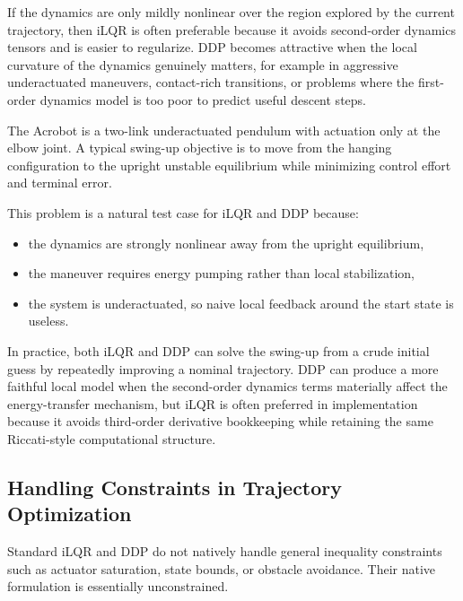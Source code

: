 \begin{remark}
	If the dynamics are only mildly nonlinear over the region explored by the current trajectory, then iLQR is often preferable because it avoids second-order dynamics tensors and is easier to regularize. DDP becomes attractive when the local curvature of the dynamics genuinely matters, for example in aggressive underactuated maneuvers, contact-rich transitions, or problems where the first-order dynamics model is too poor to predict useful descent steps.
\end{remark}

\begin{eg}\label{eg:l8-acrobot-swing-up-as-a-motivating-example}
	The Acrobot is a two-link underactuated pendulum with actuation only at the elbow joint. A typical swing-up objective is to move from the hanging configuration to the upright unstable equilibrium while minimizing control effort and terminal error.

	This problem is a natural test case for iLQR and DDP because:
	\begin{itemize}
		\item the dynamics are strongly nonlinear away from the upright equilibrium,
		\item the maneuver requires energy pumping rather than local stabilization,
		\item the system is underactuated, so naive local feedback around the start state is useless.
	\end{itemize}
	In practice, both iLQR and DDP can solve the swing-up from a crude initial guess by repeatedly improving a nominal trajectory. DDP can produce a more faithful local model when the second-order dynamics terms materially affect the energy-transfer mechanism, but iLQR is often preferred in implementation because it avoids third-order derivative bookkeeping while retaining the same Riccati-style computational structure.
\end{eg}

\subsection{Handling Constraints in Trajectory Optimization}
\label{sec:l8-handling-constraints-in-trajectory-optimization}

\begin{remark}
	Standard iLQR and DDP do not natively handle general inequality constraints such as actuator saturation, state bounds, or obstacle avoidance. Their native formulation is essentially unconstrained.
\end{remark}

